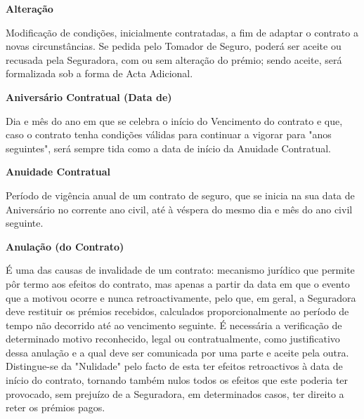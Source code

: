 \begin{description}
\item \textbf{Alteração}

Modificação de condições, inicialmente contratadas, a fim de adaptar o contrato a novas circunstâncias. Se pedida pelo Tomador de Seguro, poderá ser aceite ou recusada pela Seguradora, com ou sem alteração do prémio; sendo aceite, será formalizada sob a forma de Acta Adicional.
\end{description}

\begin{description}
\item \textbf{Aniversário Contratual (Data de)}

Dia e mês do ano em que se celebra o início do Vencimento do contrato e que, caso o contrato tenha condições válidas para continuar a vigorar para "anos seguintes", será sempre tida como a data de início da Anuidade Contratual.
\end{description}

\begin{description}
\item \textbf{Anuidade Contratual}

Período de vigência anual de um contrato de seguro, que se inicia na sua data de Aniversário no corrente ano civil, até à véspera do mesmo dia e mês do ano civil seguinte.
\end{description}

\begin{description}
\item \textbf{Anulação (do Contrato)}

É uma das causas de invalidade de um contrato: mecanismo jurídico que permite pôr termo aos efeitos do contrato, mas apenas a partir da data em que o evento que a motivou ocorre e nunca retroactivamente, pelo que, em geral, a Seguradora deve restituir os prémios recebidos, calculados proporcionalmente ao período de tempo não decorrido até ao vencimento seguinte. É necessária a verificação de determinado motivo reconhecido, legal ou contratualmente, como justificativo dessa anulação e a qual deve ser comunicada por uma parte e aceite pela outra. Distingue-se da "Nulidade" pelo facto de esta ter efeitos retroactivos à data de início do contrato, tornando também nulos todos os efeitos que este poderia ter provocado, sem prejuízo de a Seguradora, em determinados casos, ter direito a reter os prémios pagos.
\end{description}


